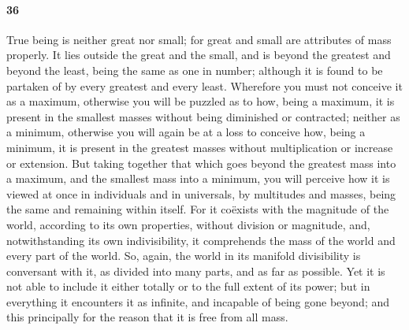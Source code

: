 \documentclass[12pt]{article}
\begin{document}
\paragraph{36} True being is neither great nor small; for great and small are
attributes of mass properly. It lies outside the great and the small, and is
beyond the greatest and beyond the least, being the same as one in number;
although it is found to be partaken of by every greatest and every least.
Wherefore you must not conceive it as a maximum, otherwise you will be puzzled
as to how, being a maximum, it is present in the smallest masses without being
diminished or contracted; neither as a minimum, otherwise you will again be at
a loss to conceive how, being a minimum, it is present in the greatest masses
without multiplication or increase or extension. But taking together that which
goes beyond the greatest mass into a maximum, and the smallest mass into a
minimum, you will perceive how it is viewed at once in individuals and in
universals, by multitudes and masses, being the same and remaining within
itself. For it co\"{e}xists with the magnitude of the world, according to its
own properties, without division or magnitude, and, notwithstanding its own
indivisibility, it comprehends the mass of the world and every part of the
world. So, again, the world in its manifold divisibility is conversant with it,
as divided into many parts, and as far as possible. Yet it is not able to
include it either totally or to the full extent of its power; but in everything
it encounters it as infinite, and incapable of being gone beyond; and this
principally for the reason that it is free from all mass.
\end{document}
